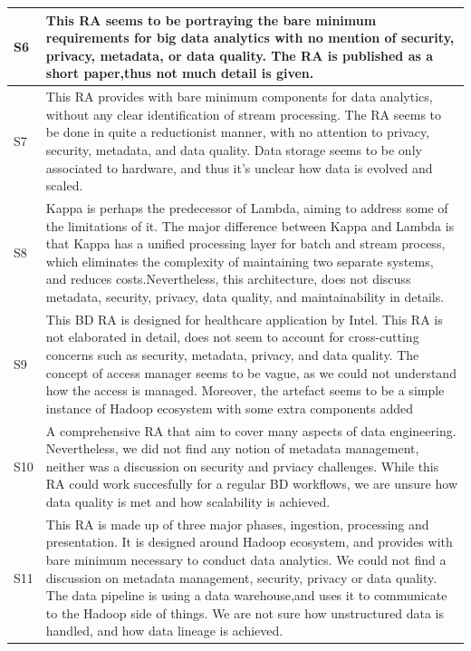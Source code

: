 \documentclass{ieeeaccess}
\begin{document}
\begin{table}
\begin{tabular}{|p{0.3cm}|p{16.8cm}|}
        \hline
        S6 & This RA seems to be portraying the bare minimum requirements for big data analytics with no mention of security, privacy, metadata, or data quality. The RA is published as a short paper,thus not much detail is given. \\
        \hline
        S7 & This RA provides with bare minimum components for data analytics, without any clear identification of stream processing. The RA seems to be done in quite a reductionist manner, with no attention to privacy, security, metadata, and data quality. Data storage seems to be only associated to hardware, and thus it's unclear how data is evolved and scaled.  \\
        \hline
        S8 & Kappa is perhaps the predecessor of Lambda, aiming to address some of the limitations of it. The major difference between Kappa and Lambda is that Kappa has a unified processing layer for batch and stream process, which eliminates the complexity of maintaining two separate systems, and reduces costs.Nevertheless, this architecture, does not discuss metadata, security, privacy, data quality, and maintainability in details.  \\
        \hline
        S9 & This BD RA is designed for healthcare application by Intel. This RA is not elaborated in detail, does not seem to account for cross-cutting concerns such as security, metadata, privacy, and data quality. The concept of access manager seems to be vague, as we could not understand how the access is managed. Moreover, the artefact seems to be a simple instance of Hadoop ecosystem with some extra components added   \\
        \hline
        S10 & A comprehensive RA that aim to cover many aspects of data engineering. Nevertheless, we did not find any notion of metadata management, neither was a discussion on security and prviacy challenges. While this RA could work succesfully for a regular BD workflows, we are unsure how data quality is met and how scalability is achieved.  \\
        \hline
        S11 & This RA is made up of three major phases, ingestion, processing and presentation. It is designed around Hadoop ecosystem, and provides with bare minimum necessary to conduct data analytics. We could not find a discussion on metadata management, security, privacy or data quality. The data pipeline is using a data warehouse,and uses it to communicate to the Hadoop side of things. We are not sure how unstructured data is handled, and how data lineage is achieved.  \\

\end{tabular}
\end{table}
\end{document}
